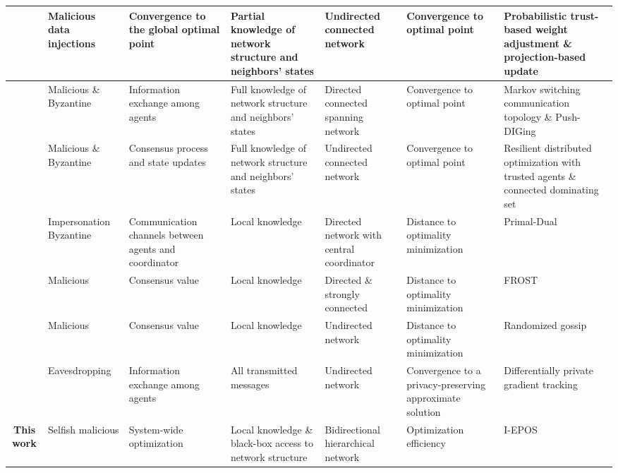 \begin{table*}[htbp]
\begin{adjustbox}{width=\textwidth}
\begin{tabular}{cp{1.5cm}p{1.5cm}p{3.5cm}p{2.5cm}p{2.5cm}p{3cm}}
      \midrule
      \cite{yemini2022resilience} & Malicious data injections & Convergence to the global optimal point & Partial knowledge of network structure and neighbors' states & Undirected connected network & Convergence to optimal point & Probabilistic trust-based weight adjustment \& projection-based update \\
      \midrule
      \cite{du2023distributed} & Malicious \& Byzantine & Information exchange among agents & Full knowledge of network structure and neighbors' states & Directed connected spanning network & Convergence to optimal point & Markov switching communication topology \& Push-DIGing \\
      \midrule
      \cite{zhao2019resilient} & Malicious \& Byzantine & Consensus process and state updates & Full knowledge of network structure and neighbors' states & Undirected connected network & Convergence to optimal point & Resilient distributed optimization with trusted agents \& connected dominating set \\
      \midrule
      \cite{uribe2019resilient, turan2020resilient} & Impersonation Byzantine & Communication channels between agents and coordinator & Local knowledge & Directed network with central coordinator & Distance to optimality minimization & Primal-Dual \\
      \midrule
      \cite{ravi2019case} & Malicious & Consensus value & Local knowledge & Directed \& strongly connected & Distance to optimality minimization & FROST \\
      \midrule
      \cite{gentz2016data} & Malicious & Consensus value & Local knowledge & Undirected network & Distance to optimality minimization & Randomized gossip \\
      \midrule
      \cite{ding2018consensus, ding2021differentially} & Eavesdropping & Information exchange among agents & All transmitted messages & Undirected network & Convergence to a privacy-preserving approximate solution & Differentially private gradient tracking  \\
    \midrule
      \textbf{This work} & Selfish malicious & System-wide optimization& Local knowledge \& black-box access to network structure & Bidirectional hierarchical network & Optimization efficiency & I-EPOS \\    
      \bottomrule
    \end{tabular} 
  \end{adjustbox}
  \label{t1}
\end{table*}

